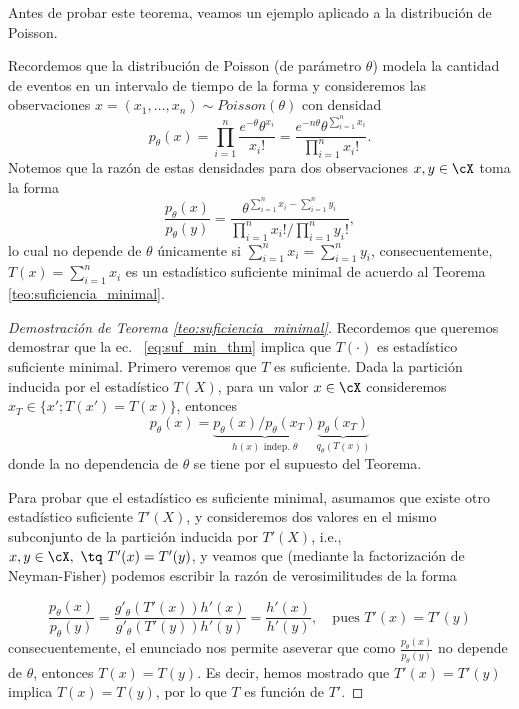 Antes de probar este teorema, veamos un ejemplo aplicado a la distribución de Poisson. 
\begin{example}
	Recordemos que la distribución de Poisson (de parámetro $\theta$) modela la cantidad de eventos en un intervalo de tiempo de la forma y consideremos las observaciones $x=(x_1,\ldots, x_n)\sim Poisson(\theta)$ con densidad
	\begin{equation}
		p_\theta(x) = \prod_{i=1}^n\frac{e^{-\theta}\theta^{x_i}}{x_i!} = \frac{e^{-n\theta}\theta^{\sum_{i=1}^n x_i}}{\prod_{i=1}^nx_i!}.
	\end{equation}
	Notemos que la razón de estas densidades para dos observaciones $x,y\in\cX$ toma la forma 
		\begin{equation}
		\frac{p_\theta(x)}{p_\theta(y)} = \frac{\theta^{\sum_{i=1}^n x_i - \sum_{i=1}^n y_i}} {\prod_{i=1}^nx_i! / \prod_{i=1}^ny_i!}, 
	\end{equation}
	lo cual no depende de $\theta$ únicamente si $\sum_{i=1}^n x_i  = \sum_{i=1}^n y_i$, consecuentemente, $T(x) = \sum_{i=1}^n x_i$ es un estadístico suficiente minimal de acuerdo al Teorema \ref{teo:suficiencia_minimal}.
\end{example}

\begin{proof}[Demostración de Teorema \ref{teo:suficiencia_minimal}] Recordemos que queremos demostrar que la ec.~ \eqref{eq:suf_min_thm} implica que $T(\cdot)$ es estadístico suficiente minimal. Primero veremos que $T$ es suficiente. Dada la partición inducida por el estadístico $T(X)$, para un valor $x\in\cX$ consideremos $x_T\in\{x'; T(x') = T(x)\}$, entonces
\begin{equation}
 	p_\theta(x) = \underbrace{{p_\theta(x) }/{p_\theta(x_T) }}_{h(x)\text{ indep.  } \theta} \underbrace{p_\theta(x_T) }_{q_\theta(T(x))	}
 \end{equation} 
 donde la no dependencia de $\theta$ se tiene por el supuesto del Teorema. 

 Para probar que el estadístico es suficiente minimal, asumamos que existe otro estadístico suficiente $T'(X)$, y consideremos dos valores en el mismo subconjunto de la partición inducida por $T'(X)$, i.e., $x,y\in\cX,\ \tq\ T'(x) = T'(y)$, y veamos que (mediante la factorización de Neyman-Fisher) podemos escribir la razón de verosimilitudes de la forma

 \begin{equation}
 	\frac{p_\theta(x)}{p_\theta(y)} = \frac{g'_\theta(T'(x))h'(x)}{g'_\theta(T'(y))h'(y)} = \frac{h'(x)}{h'(y)}, \quad \text{pues } T'(x) = T'(y) 
 \end{equation}
 consecuentemente, el enunciado nos permite aseverar que como $\frac{p_\theta(x)}{p_\theta(y)}$ no depende de $\theta$, entonces $T(x) = T(y)$. Es decir, hemos mostrado que $T'(x) = T'(y)$ implica $T(x) = T(y)$, por lo que $T$ es función de $T'$.
	
\end{proof}


